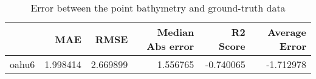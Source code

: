 \begin{table}[h!]
\caption{Error between the point bathymetry and ground-truth data}
\label{tab:oahu6_lidar_error}
\begin{tabular}{lrrrrr}
\toprule
 & MAE & RMSE & Median Abs error & R2 Score & Average Error \\
\midrule
oahu6 & 1.998414 & 2.669899 & 1.556765 & -0.740065 & -1.712978 \\
\bottomrule
\end{tabular}
\end{table}
